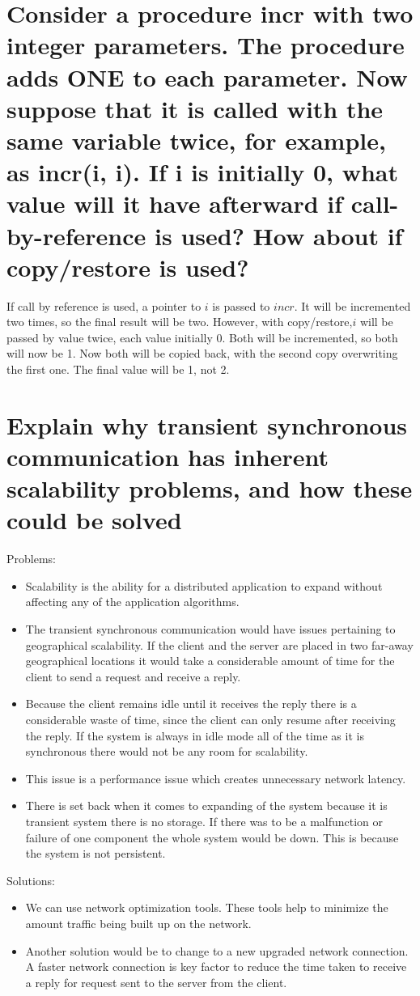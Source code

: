 \documentclass[11pt,a4paper]{article}
\begin{document}
  	\section{Consider a procedure incr with two integer parameters. The procedure adds ONE to each parameter. Now suppose that it is called with the same variable twice, for example, as incr(i, i). If i is initially 0, what value will it have afterward if call-by-reference is used? How about if copy/restore is used?}
  	If call by reference is used, a pointer to $ i $ is passed to $incr$. It will be incremented two times, so the final result will be two. However, with copy/restore,$ i $ will be passed by value twice, each value initially 0. Both will be incremented, so both will now be 1. Now both will be copied back, with the second copy overwriting the first one. The final value will be 1, not 2.
  	
  	\section{Explain why transient synchronous communication has inherent scalability problems, and how these could be solved}
  	Problems:
  	\begin{itemize}
  		\item Scalability is the ability for a distributed application to expand without affecting any of the application algorithms.
  		\item The transient synchronous communication would have issues pertaining to geographical scalability. If the client and the server are placed in two far-away geographical locations it would take a considerable amount of time for the client to send a request and receive a reply.
  		\item Because the client remains idle until it receives the reply there is a considerable waste of time, since the client can only resume after receiving the reply. If the system is always in idle mode all of the time as it is synchronous there would not be any room for scalability.
  		\item This issue is a performance issue which creates unnecessary network latency.
  		\item There is set back when it comes to expanding of the system because it is transient system there is no storage. If there was to be a malfunction or failure of one component the whole system would be down. This is because the system is not persistent.
  	\end{itemize}
	Solutions:
	\begin{itemize}
		\item We can use network optimization tools. These tools help to minimize the amount traffic being built up on the network.
		\item Another solution would be to change to a new upgraded network connection. A faster network connection is key factor to reduce the time taken to receive a reply for request sent to the server from the client.
	\end{itemize}
\end{document}
